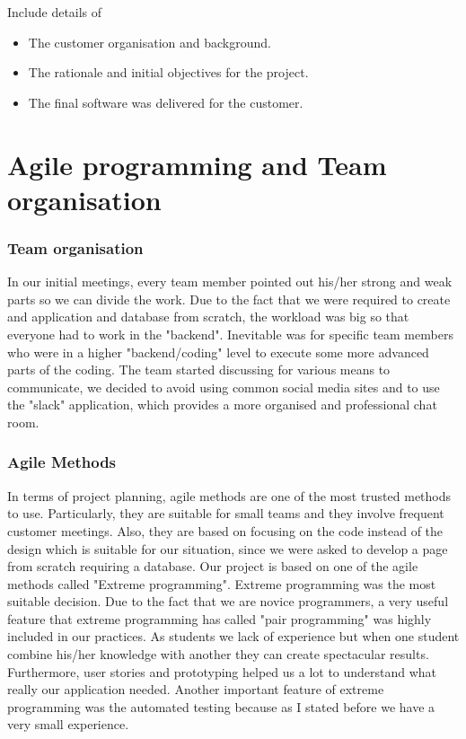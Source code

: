 \documentclass{l3proj}
\begin{document}
Include details of 

\begin{itemize}
\item The customer organisation and background.
\item The rationale and initial objectives for the project.
\item The final software was delivered for the customer.
\end{itemize}

\section{Agile programming and Team organisation}

\subsubsection{Team organisation}
\label{organisation}

In our initial meetings, every team member pointed out his/her strong and weak parts so we can divide the work. Due to the fact that we were required to create and application and database from scratch, the workload was big so that everyone had to work in the "backend". Inevitable was for specific team members who were in a higher "backend/coding" level to execute some more advanced parts of the coding.
The team started discussing for various means to communicate, we decided to avoid using common social media sites and to use the "slack" application, which provides a more organised and professional chat room. 

\subsubsection{Agile Methods}
\label{agile}

In terms of project planning, agile methods are one of the most trusted methods to use. Particularly, they are suitable for small teams and they involve frequent customer meetings. Also, they are based on focusing on the code instead of the design which is suitable for our situation, since we were asked to develop a page from scratch requiring a database. Our project is based on one of the agile methods called "Extreme programming". Extreme programming was the most suitable decision. Due to the fact that we are novice programmers, a very useful feature that extreme programming has called "pair programming" was highly included in our practices. As students we lack of experience but when one student combine his/her knowledge with another they can create spectacular results. Furthermore, user stories and prototyping helped us a lot to understand what really our application needed. Another important feature of extreme programming was the automated testing because as I stated before we have a very small experience.
\end{document}
